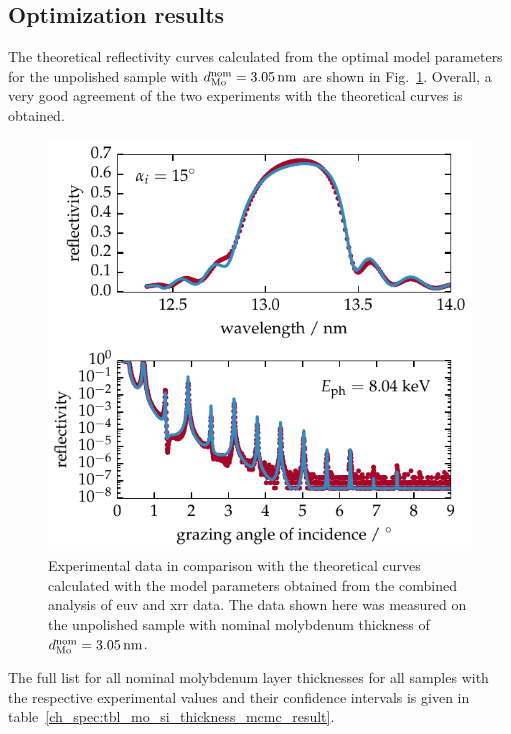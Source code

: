 \subsection{Optimization results} \label{ch_spec:sec_mo_si_c_results}
The theoretical reflectivity curves calculated from the optimal model parameters for the unpolished sample with $d_\text{Mo}^\text{nom} = \nm{3.05}$ are shown in Fig.~\ref{ch_spec:fig_EUV_XRR_combined}. Overall, a very good agreement of the two experiments with the theoretical curves is obtained.
\begin{figure}[htbp]
\centering
\includegraphics{img/PS5657}
\caption[Experimental data in comparison with the theoretical curves for the unpolished Mo/Si/C sample with $d_\text{Mo}^\text{nom} = \nm{3.05}$.]{Experimental data in comparison with the theoretical curves calculated with the model parameters obtained from the combined analysis of \gls{euv} and \gls{xrr} data. The data shown here was measured on the unpolished sample with nominal molybdenum thickness of $d_\text{Mo}^\text{nom} = \nm{3.05}$.}
\label{ch_spec:fig_EUV_XRR_combined}
\end{figure}
The full list for all nominal molybdenum layer thicknesses for all samples with the respective experimental values and their confidence intervals is given in table~\ref{ch_spec:tbl_mo_si_thickness_mcmc_result}.
